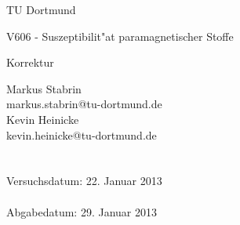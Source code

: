 \documentclass{scrartcl}
\begin{document}
	
	\vspace*{3cm}

	\begin{center}
		\large
		TU Dortmund
	\end{center}

	\begin{center}
		\Huge
		V606 - Suszeptibilit"at paramagnetischer Stoffe
	\end{center}

	\begin{center}
		\large
		Korrektur
	\end{center}

	\vspace{6cm} %
	\begin{center}
		\begin{minipage}[b]{8cm}
			\Large
			Markus Stabrin \\
			\normalsize
			markus.stabrin@tu-dortmund.de \\

			\Large
			Kevin Heinicke\\
			\normalsize
			kevin.heinicke@tu-dortmund.de \\
			\\
			\\

			Versuchsdatum: 22. Januar 2013 \\
			\\
			Abgabedatum: 29. Januar 2013
		\end{minipage}
	\end{center}

	\newpage

	

	

	

	
\end{document}
